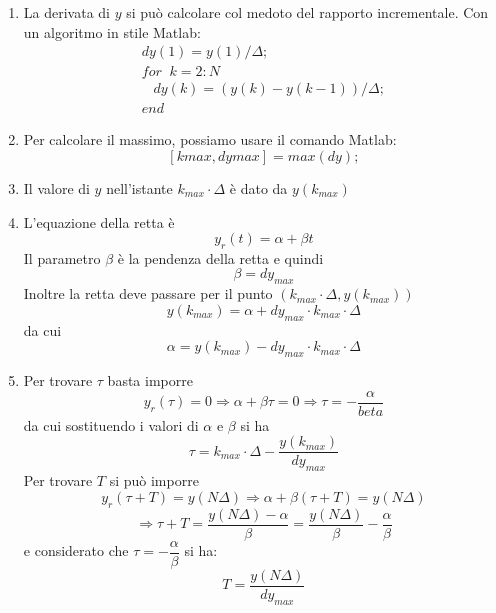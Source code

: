 \documentclass[a4paper]{report}
\begin{document}
\begin{enumerate}[label=\underline{\emph{Punto \alph*}}]
\item La derivata di $y$ si pu\`o calcolare col medoto del rapporto
  incrementale. Con un algoritmo in stile Matlab:
  \[
  \begin{array}{l}
    dy(1) = y(1)/\Delta;\\
    for\;\; k = 2 : N\\
    \;\;\; dy(k) = (y(k) - y(k-1))/\Delta;\\
    end  
  \end{array}
  \]
\item Per calcolare il massimo, possiamo usare il comando Matlab:
  \[
  [kmax, dymax] = max(dy);
  \]
\item Il valore di $y$ nell'istante $k_{max}\cdot \Delta$ \`e dato da
  $y(k_{max})$
\item L'equazione della retta \`e
  \[
  y_r(t) = \alpha + \beta t
  \]
  Il parametro $\beta$ \`e la pendenza della retta e quindi
  \[
  \beta = dy_{max}
  \]
  Inoltre la retta deve passare per il punto $(k_{max}\cdot \Delta,
  y(k_{max}))$
  \[
   y(k_{max}) = \alpha + dy_{max} \cdot k_{max} \cdot \Delta
  \]
  da cui
  \[
  \alpha  = y(k_{max}) - dy_{max} \cdot k_{max} \cdot \Delta
  \]
\item Per trovare $\tau$ basta imporre
  \[
  y_r(\tau) = 0 \Rightarrow \alpha + \beta \tau = 0 \Rightarrow \tau = -\dfrac{\alpha}{beta}
  \]
  da cui sostituendo i valori di $\alpha$ e $\beta$ si ha
  \[
  \tau = k_{max} \cdot \Delta - \dfrac{y(k_{max})}{dy_{max}}
  \]
  Per trovare $T$ si pu\`o imporre
  \[
  y_r(\tau + T) = y(N\Delta) \Rightarrow \alpha + \beta(\tau + T) = y(N\Delta)
  \]
  \[
  \Rightarrow \tau + T = \dfrac{y(N\Delta) - \alpha}{\beta} =
  \dfrac{y(N\Delta)}{\beta} - \dfrac{\alpha}{\beta}
  \]
  e considerato che $\tau = - \dfrac{\alpha}{\beta}$ si ha:
  \[
  T = \dfrac{y(N\Delta)}{dy_{max}}
  \]
\end{enumerate}
\end{document}
